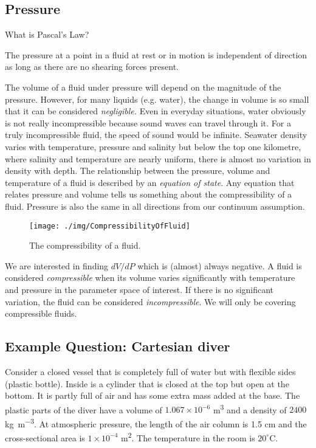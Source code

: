 \subsection{Pressure}
What is Pascal's Law?
\begin{center}
  The pressure at a point in a fluid at rest or in motion is independent of direction as long as there are no shearing forces present.
\end{center}
The volume of a fluid under pressure will depend on the magnitude of the pressure. However, for many liquids (e.g. water), the change in volume is so small that it can be considered \emph{negligible.} Even in everyday situations, water obviously is not really incompressible because sound waves can travel through it. For a truly incompressible fluid, the speed of sound would be infinite. Seawater density varies with temperature, pressure and salinity but below the top one kilometre, where salinity and temperature are nearly uniform, there is almost no variation in density with depth. The relationship between the pressure, volume and temperature of a fluid is described by an \emph{equation of state}. Any equation that relates pressure and volume tells us something about the compressibility of a fluid. Pressure is also the same in all directions from our continuum assumption.
\begin{figure}[h!]
  \centering
  \texttt{[image: ./img/CompressibilityOfFluid]}
  \caption{The compressibility of a fluid.}
\end{figure}
We are interested in finding \( dV/dP\) which is (almost) always negative. A fluid is considered \emph{compressible} when its volume varies significantly with temperature and pressure in the parameter space of interest. If there is no significant variation, the fluid can be considered \emph{incompressible}. We will only be covering compressible fluids.
\subsection{Example Question: Cartesian diver}
Consider a closed vessel that is completely full of water but with flexible sides (plastic bottle). Inside is a cylinder that is closed at the top but open at the bottom. It is partly full of air and has some extra mass added at the base. The plastic parts of the diver have a volume of \(1.067\times 10^{-6} \) \si{\meter\cubed} and a density of \(2400\) \si{\kg\per\meter\cubed}. At atmospheric pressure, the length of the air column is 1.5 \si{\cm} and the cross-sectional area is \(1\times 10^{-4}\) \si{\meter\squared}. The temperature in the room is \(20^{\circ}\)C.


